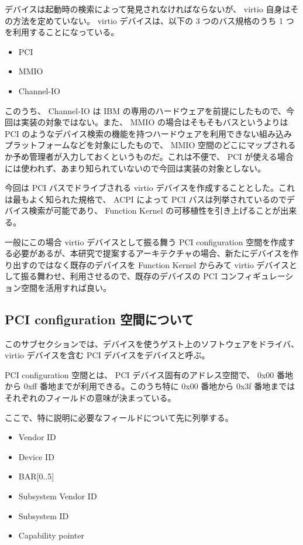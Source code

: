 \documentclass[a4paper,11pt,report]{ltjsbook}
\begin{document}
デバイスは起動時の検索によって発見されなければならないが、 virtio 自身はその方法を定めていない。 virtio デバイスは、以下の 3 つのバス規格のうち 1 つを利用することになっている。

\begin{itemize}
\item PCI
\item MMIO
\item Channel-IO
\end{itemize}

このうち、 Channel-IO は IBM の専用のハードウェアを前提にしたもので、今回は実装の対象ではない。また、 MMIO の場合はそもそもバスというよりは PCI のようなデバイス検索の機能を持つハードウェアを利用できない組み込みプラットフォームなどを対象にしたもので、 MMIO 空間のどこにマップされるか予め管理者が入力しておくというものだ。これは不便で、 PCI が使える場合には使われず、あまり知られていないので今回は実装の対象としない。

今回は PCI バスでドライブされる virtio デバイスを作成することとした。これは最もよく知られた規格で、 ACPI によって PCI バスは列挙されているのでデバイス検索が可能であり、 Function Kernel の可移植性を引き上げることが出来る。

一般にこの場合 virtio デバイスとして振る舞う PCI configuration 空間を作成する必要があるが、本研究で提案するアーキテクチャの場合、新たにデバイスを作り出すのではなく既存のデバイスを Function Kernel からみて virtio デバイスとして振る舞わせ、利用させるので、既存のデバイスの PCI コンフィギュレーション空間を活用すれば良い。

\subsection{PCI configuration 空間について}
\label{about_pciconfig}

このサブセクションでは、デバイスを使うゲスト上のソフトウェアをドライバ、 virtio デバイスを含む PCI デバイスをデバイスと呼ぶ。

PCI configuration 空間とは、 PCI デバイス固有のアドレス空間で、 0x00 番地から 0xff 番地までが利用できる。このうち特に 0x00 番地から 0x3f 番地まではそれぞれのフィールドの意味が決まっている。

ここで、特に説明に必要なフィールドについて先に列挙する。

\begin{itemize}
\item Vendor ID
\item Device ID
\item BAR[0..5]
\item Subsystem Vendor ID
\item Subsystem ID
\item Capability pointer
\end{itemize}
\end{document}
